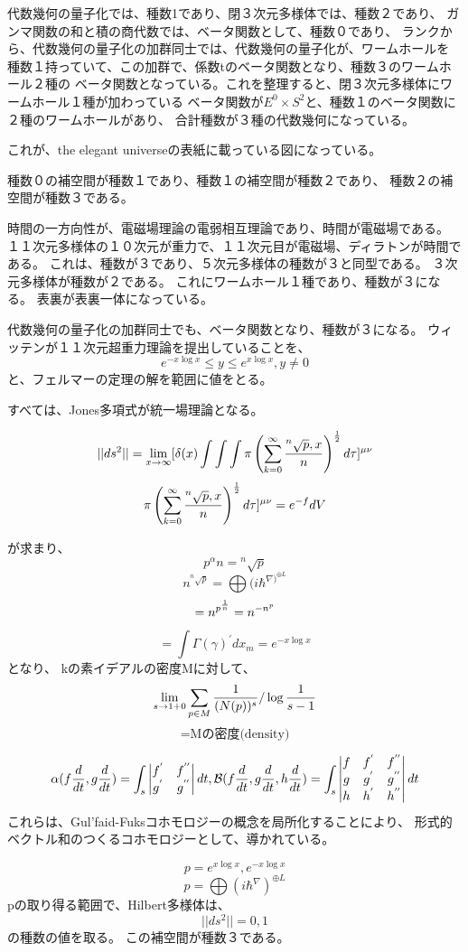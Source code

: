 \documentclass{jsarticle}
\begin{document}
        代数幾何の量子化では、種数1であり、閉３次元多様体では、種数２であり、
    ガンマ関数の和と積の商代数では、ベータ関数として、種数０であり、
    ランクから、代数幾何の量子化の加群同士では、代数幾何の量子化が、ワームホールを
    種数１持っていて、この加群で、係数tのベータ関数となり、種数３のワームホール２種の
    ベータ関数となっている。これを整理すると、閉３次元多様体にワームホール１種が加わっている
    ベータ関数が$E^{0} \times S^{2} $と、種数１のベータ関数に２種のワームホールがあり、
    合計種数が３種の代数幾何になっている。


      これが、the elegant universeの表紙に載っている図になっている。

      種数０の補空間が種数１であり、種数１の補空間が種数２であり、
      種数２の補空間が種数３である。

      時間の一方向性が、電磁場理論の電弱相互理論であり、時間が電磁場である。
      １１次元多様体の１０次元が重力で、１１次元目が電磁場、ディラトンが時間である。
      これは、種数が３であり、５次元多様体の種数が３と同型である。
      ３次元多様体が種数が２である。
      これにワームホール１種であり、種数が３になる。
      表裏が表裏一体になっている。

      代数幾何の量子化の加群同士でも、ベータ関数となり、種数が３になる。
      ウィッテンが１１次元超重力理論を提出していることを、
      $$ e^{-x \log x} \le y \le e^{x \log x}, y \neq 0 $$
      と、フェルマーの定理の解を範囲に値をとる。

      すべては、Jones多項式が統一場理論となる。

$$ ||ds^2|| = \lim_{x \to \infty} [\delta(x) \int \int \int \pi \left( \sum_{k=0}^{\infty}
		{{}^n\sqrt{p},x \over n} \right)
^{1 \over 2}d \tau]^{\mu\nu} $$
$$ \pi \left( \sum_{k=0}^{\infty}
		{{}^n\sqrt{p},x \over n} \right)
^{1 \over 2}d \tau]^{\mu\nu} = e^{-f}dV $$

     が求まり、
     $$ p^{\alpha} n = {}^n \sqrt{p} $$
     $$ n^{{}^n\sqrt{p}} = \bigoplus{(i \hbar^{{{\nabla)}}^{\oplus 
     L}}} $$
     $$ = n^{p^{{1 \over n}}} = n^{{-n}^{p}}  $$
     $$ = \int \Gamma(\gamma)^{'}dx_m = e^{-x \log x} $$
     となり、
     kの素イデアルの密度Mに対して、
     $$ \lim_{s \to {1 + 0}} \sum_{{p \in M}} {
	     1 \over (N(p))^{s}}/ \log {1 \over 
     {s - 1} } $$
     $$ = \text{Mの密度(density)} $$

     $$ \alpha(f{d \over dt},g{d \over dt}) = \int_s \begin{vmatrix}
	     f^{'} & f^{''} \\
	     g^{'} & g^{''} \end{vmatrix}dt,
	     \mathcal{B}(f{d \over dt},g{d \over dt},h{d \over dt}) =
	     \int_s \begin{vmatrix} f & f^{'} & f^{''} \\
		     g & g^{'} & g^{''} \\
	     h & h^{'} & h^{''} \end{vmatrix}dt $$
    これらは、Gul'faid-Fuksコホモロジーの概念を局所化することにより、
    形式的ベクトル和のつくるコホモロジーとして、導かれている。


    $$ p = e^{x \log x},e^{-x \log x} $$
    $$ p = \bigoplus{(i \hbar^{\nabla})}^{\oplus L} $$
    pの取り得る範囲で、Hilbert多様体は、
    $$ ||ds^2|| = 0,1 $$
    の種数の値を取る。
    この補空間が種数３である。
\end{document}
